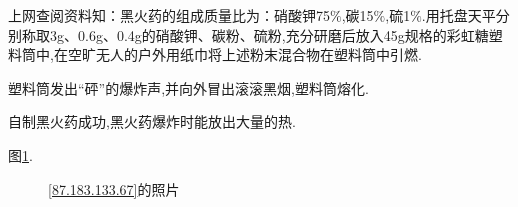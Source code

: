 \documentclass[hyperref,UTF8]{ctexart}
\begin{document}
上网查阅资料知：黑火药的组成质量比为：硝酸钾75$\%$,碳15$\%$,硫1$\%$.用托盘天平分别称取3g、0.6g、0.4g的硝酸钾、碳粉、硫粉,充分研磨后放入45g规格的彩虹糖塑料筒中,在空旷无人的户外用纸巾将上述粉末混合物在塑料筒中引燃.

塑料筒发出“砰”的爆炸声,并向外冒出滚滚黑烟,塑料筒熔化.

自制黑火药成功,黑火药爆炸时能放出大量的热.

图\ref{89.110.53.22}.

\begin{figure}[h]
    \centering
    \hspace{1in}
    \caption{\ref{87.183.133.67}的照片}
    \label{89.110.53.22}
\end{figure}
\end{document}
